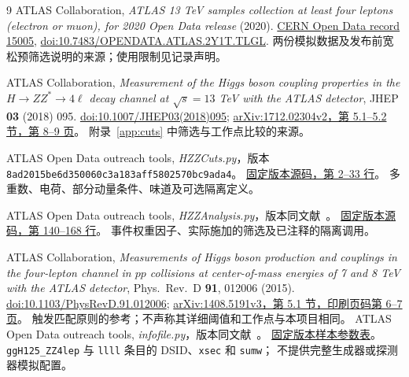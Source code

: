\documentclass[11pt,a4paper,fontset=fandol,scheme=plain]{ctexart}
\begin{document}
\begingroup
\small
\renewcommand{\refname}{本报告参考文献}
\begin{thebibliography}{9}
ATLAS Collaboration, \emph{ATLAS 13 TeV samples collection at least four leptons
(electron or muon), for 2020 Open Data release} (2020).
\href{https://opendata.cern.ch/record/15005}{CERN Open Data record 15005},
\href{https://doi.org/10.7483/OPENDATA.ATLAS.2Y1T.TLGL}{doi:10.7483/OPENDATA.ATLAS.2Y1T.TLGL}.
两份模拟数据及发布前宽松预筛选说明的来源；使用限制见记录声明。

ATLAS Collaboration, \emph{Measurement of the Higgs boson coupling properties in
the $H\to ZZ^*\to4\ell$ decay channel at $\sqrt{s}=13$ TeV with the ATLAS detector},
JHEP \textbf{03} (2018) 095.
\href{https://doi.org/10.1007/JHEP03(2018)095}{doi:10.1007/JHEP03(2018)095};
\href{https://arxiv.org/pdf/1712.02304v2#page=8}{arXiv:1712.02304v2，第 5.1--5.2 节，第 8--9 页}。
附录~\ref{app:cuts} 中筛选与工作点比较的来源。

ATLAS Open Data outreach tools, \emph{HZZCuts.py}，版本
\nolinkurl{8ad2015be6d350060c3a183aff5802570bc9ada4}。
\href{https://github.com/atlas-outreach-data-tools/atlas-outreach-Python-uproot-framework-13tev/blob/8ad2015be6d350060c3a183aff5802570bc9ada4/HZZCuts.py#L2-L33}{固定版本源码，第 2--33 行}。
多重数、电荷、部分动量条件、味道及可选隔离定义。

ATLAS Open Data outreach tools, \emph{HZZAnalysis.py}，版本同文献~\cite{HZZCuts}。
\href{https://github.com/atlas-outreach-data-tools/atlas-outreach-Python-uproot-framework-13tev/blob/8ad2015be6d350060c3a183aff5802570bc9ada4/HZZAnalysis.py#L140-L168}{固定版本源码，第 140--168 行}。
事件权重因子、实际施加的筛选及已注释的隔离调用。

ATLAS Collaboration, \emph{Measurements of Higgs boson production and couplings
in the four-lepton channel in $pp$ collisions at center-of-mass energies of
7 and 8 TeV with the ATLAS detector}, Phys.~Rev.~D \textbf{91}, 012006 (2015).
\href{https://doi.org/10.1103/PhysRevD.91.012006}{doi:10.1103/PhysRevD.91.012006};
\href{https://arxiv.org/pdf/1408.5191v3#page=7}{arXiv:1408.5191v3，第 5.1 节，印刷页码第 6--7 页}。
触发匹配原则的参考；不声称其详细阈值和工作点与本项目相同。
ATLAS Open Data outreach tools, \emph{infofile.py}，版本同文献~\cite{HZZCuts}。
\href{https://github.com/atlas-outreach-data-tools/atlas-outreach-Python-uproot-framework-13tev/blob/8ad2015be6d350060c3a183aff5802570bc9ada4/infofile.py}{固定版本样本参数表}。
\texttt{ggH125\_ZZ4lep} 与 \texttt{llll} 条目的 DSID、\texttt{xsec} 和 \texttt{sumw}；
不提供完整生成器或探测器模拟配置。
\end{thebibliography}
\endgroup
\end{document}

